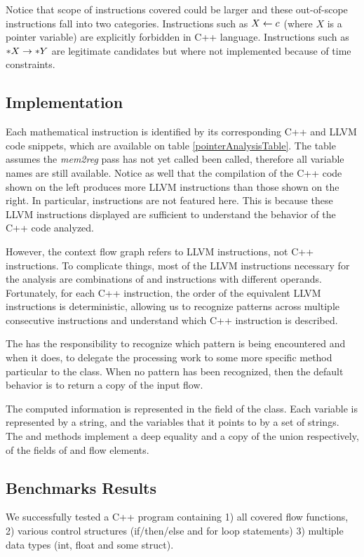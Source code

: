 Notice that scope of instructions covered could be larger and these out-of-scope instructions fall into two categories. Instructions such as $X \leftarrow c$ (where $X$ is a pointer variable) are explicitly forbidden in C++ language. Instructions such as $*X \rightarrow *Y$ are legitimate candidates but where not implemented because of time constraints. 
\subsection{Implementation}
Each mathematical instruction is identified by its corresponding C++ and LLVM code snippets, which are available on table \ref{pointerAnalysisTable}. The table assumes the \emph{mem2reg} pass has not yet called been called, therefore all variable names are still available. Notice as well that the compilation of the C++ code shown on the left produces more LLVM instructions than those shown on the right. In particular,  instructions are not featured here. This is because these LLVM instructions displayed are sufficient to understand the behavior of the C++ code analyzed.

However, the context flow graph refers to LLVM instructions, not C++ instructions. To complicate things, most of the LLVM instructions necessary for the analysis are combinations of  and  instructions with different operands. Fortunately, for each C++ instruction, the order of the equivalent LLVM instructions is deterministic, allowing us to recognize patterns across multiple consecutive instructions and understand which C++ instruction is described. 

The  has the responsibility to recognize which pattern is being encountered and when it does, to delegate the processing work to some more specific method particular to the  class.  
When no pattern has been recognized, then the default behavior is to return a copy of the input flow.

The computed information is represented in the  field of the  class. Each variable is represented by a string, and the variables that it points to by a set of strings. The  and  methods implement a deep equality and a copy of the union respectively, of the  fields of  and  flow elements.

\subsection*{Benchmarks Results}

We successfully tested a C++ program containing 1) all covered flow functions, 2) various control structures (if/then/else and for loop statements) 3) multiple data types (int, float and some struct).

